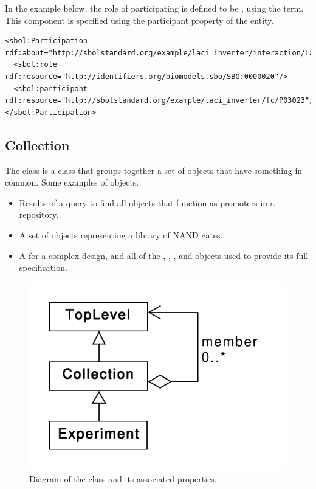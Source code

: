 In the example below, the role of participating  is defined to be , using the  term. This component is specified using the participant property of the  entity.
\begin{lstlisting}
<sbol:Participation rdf:about="http://sbolstandard.org/example/laci_inverter/interaction/LacI_pLacI/participation/P03023">
  <sbol:role rdf:resource="http://identifiers.org/biomodels.sbo/SBO:0000020"/>
  <sbol:participant rdf:resource="http://sbolstandard.org/example/laci_inverter/fc/P03023"/>
</sbol:Participation>
\end{lstlisting}

\subsection {Collection}
\label{sec:Collection}
The  class is a class that groups together a set of  objects that have something in common. 
Some examples of  objects:
\begin{itemize}
\item Results of a query to find all  objects that function as promoters in a repository.
\item A set of  objects representing a library of NAND gates.
\item A  for a complex design, and all of the , , , and  objects used to provide its full specification.
\end{itemize}

\begin{figure}[ht]
\begin{center}
\includegraphics[scale=0.6]{uml/collection}
\caption[]{Diagram of the  class and its associated properties.}
\label{uml:collection}
\end{center}
\end{figure}

